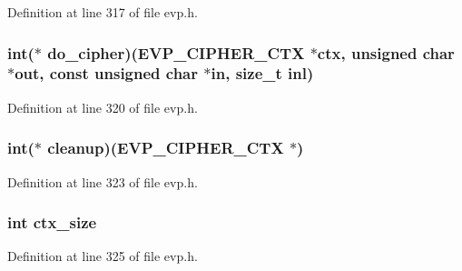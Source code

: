 Definition at line 317 of file evp.\+h.

\subsubsection[{\texorpdfstring{do\+\_\+cipher}{do_cipher}}]{\setlength{\rightskip}{0pt plus 5cm}int($\ast$ do\+\_\+cipher)({\bf E\+V\+P\+\_\+\+C\+I\+P\+H\+E\+R\+\_\+\+C\+TX} $\ast$ctx, unsigned char $\ast$out, const unsigned char $\ast$in, size\+\_\+t inl)}\hypertarget{structevp__cipher__st_a8f0316220cf8f3aa0ef47e6bb9baa412}{}\label{structevp__cipher__st_a8f0316220cf8f3aa0ef47e6bb9baa412}


Definition at line 320 of file evp.\+h.

\subsubsection[{\texorpdfstring{cleanup}{cleanup}}]{\setlength{\rightskip}{0pt plus 5cm}int($\ast$ cleanup)({\bf E\+V\+P\+\_\+\+C\+I\+P\+H\+E\+R\+\_\+\+C\+TX} $\ast$)}\hypertarget{structevp__cipher__st_a657ab7bf792951d6cfdca0647bdf69eb}{}\label{structevp__cipher__st_a657ab7bf792951d6cfdca0647bdf69eb}


Definition at line 323 of file evp.\+h.

\subsubsection[{\texorpdfstring{ctx\+\_\+size}{ctx_size}}]{\setlength{\rightskip}{0pt plus 5cm}int ctx\+\_\+size}\hypertarget{structevp__cipher__st_a283e909780db477722c366b5e1425f7d}{}\label{structevp__cipher__st_a283e909780db477722c366b5e1425f7d}


Definition at line 325 of file evp.\+h.

